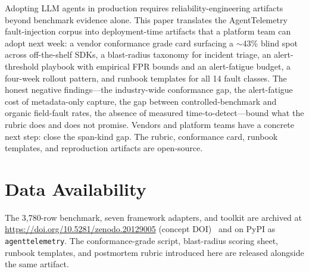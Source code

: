 \documentclass[conference]{IEEEtran}
\begin{document}
Adopting LLM agents in production requires reliability-engineering
artifacts beyond benchmark evidence alone. This paper translates the
AgentTelemetry fault-injection corpus into deployment-time artifacts
that a platform team can adopt next week: a vendor conformance grade
card surfacing a $\sim$43\% blind spot across off-the-shelf SDKs,
a blast-radius taxonomy for incident triage, an alert-threshold
playbook with empirical FPR bounds and an alert-fatigue budget, a
four-week rollout pattern, and runbook templates for all 14 fault
classes. The honest negative findings---the industry-wide
conformance gap, the alert-fatigue cost of metadata-only capture,
the gap between controlled-benchmark and organic field-fault rates,
the absence of measured time-to-detect---bound what the rubric does
and does not promise. Vendors and platform teams have a concrete next
step: close the span-kind gap. The rubric, conformance card, runbook
templates, and reproduction artifacts are open-source.

\section*{Data Availability}

The 3{,}780-row benchmark, seven framework adapters, and toolkit are
archived at \url{https://doi.org/10.5281/zenodo.20129005}
(concept DOI)~\cite{agenttelemetry_artifact} and on PyPI as
\texttt{agenttelemetry}. The conformance-grade script, blast-radius
scoring sheet, runbook templates, and postmortem rubric introduced
here are released alongside the same artifact.

\balance


\end{document}
